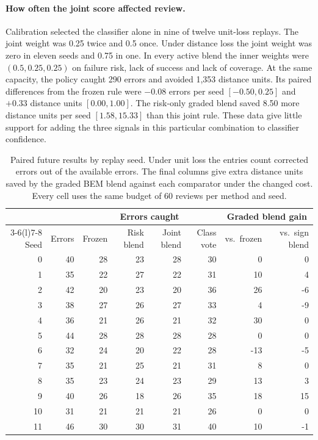 \paragraph{How often the joint score affected review.}
Calibration selected the classifier alone in nine of twelve unit-loss
replays. The joint weight was 0.25 twice and 0.5 once. Under distance loss
the joint weight was zero in eleven seeds and 0.75 in one. In every active
blend the inner weights were $(0.5,0.25,0.25)$ on failure risk, lack of
success and lack of coverage. At the same capacity, the policy caught
290 errors and avoided 1,353 distance units. Its paired differences from
the frozen rule were $-0.08$ errors per seed $[-0.50,0.25]$ and $+0.33$
distance units $[0.00,1.00]$. The risk-only graded blend saved 8.50 more
distance units per seed $[1.58,15.33]$ than this joint rule. These data
give little support for adding the three signals in this particular
combination to classifier confidence.

\begin{table}[htbp]
\centering\small
\caption{Paired future results by replay seed. Under unit loss the entries
count corrected errors out of the available errors. The final columns give
extra distance units saved by the graded BEM blend against each comparator
under the changed cost. Every cell uses the same budget of 60 reviews per method
and seed.}
\label{tab:digit-paired}
\begin{tabular}{@{}rrrrrrrr@{}}
\toprule
 & & \multicolumn{4}{c}{Errors caught} & \multicolumn{2}{c}{Graded blend gain} \\
\cmidrule(lr){3-6}\cmidrule(l){7-8}
Seed & Errors & Frozen & Risk blend & Joint blend & Class vote & vs.\ frozen & vs.\ sign blend \\
\midrule
0 & 40 & 28 & 23 & 28 & 30 & 0 & 0 \\
1 & 35 & 22 & 27 & 22 & 31 & 10 & 4 \\
2 & 42 & 20 & 23 & 20 & 36 & 26 & -6 \\
3 & 38 & 27 & 26 & 27 & 33 & 4 & -9 \\
4 & 36 & 21 & 26 & 21 & 32 & 30 & 0 \\
5 & 44 & 28 & 28 & 28 & 28 & 0 & 0 \\
6 & 32 & 24 & 20 & 22 & 28 & -13 & -5 \\
7 & 35 & 21 & 25 & 21 & 31 & 8 & 0 \\
8 & 35 & 23 & 24 & 23 & 29 & 13 & 3 \\
9 & 40 & 26 & 18 & 26 & 35 & 18 & 15 \\
10 & 31 & 21 & 21 & 21 & 26 & 0 & 0 \\
11 & 46 & 30 & 30 & 31 & 40 & 10 & -1 \\
\bottomrule
\end{tabular}
\end{table}


